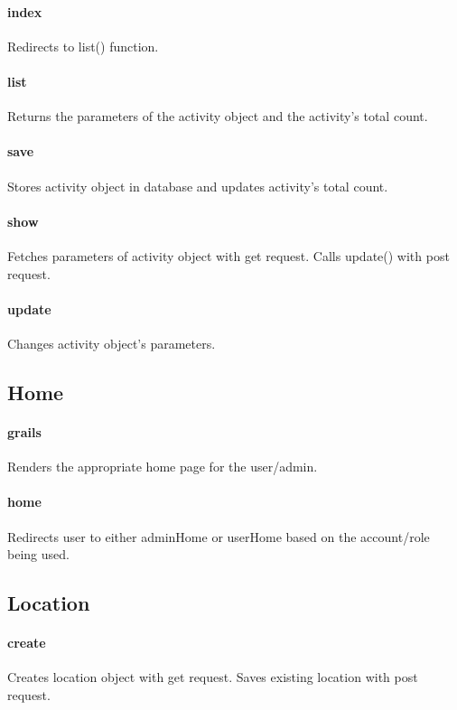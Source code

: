 \documentclass[12pt]{article}
\begin{document}
\paragraph{index} Redirects to list() function.
\paragraph{list} Returns the parameters of the activity object and the activity's total count.
\paragraph{save} Stores activity object in database and updates activity's total count.
\paragraph{show} Fetches parameters of activity object with get request. Calls update() with post request.
\paragraph{update} Changes activity object's parameters.

\subsection{Home}\label{sec:CHome}
\paragraph{grails} Renders the appropriate home page for the user/admin.
\paragraph{home} Redirects user to either adminHome or userHome based on the account/role being used.

\subsection{Location}\label{sec:CLocation}
\paragraph{create} Creates location object with get request. Saves existing location with post request.
\end{document}
